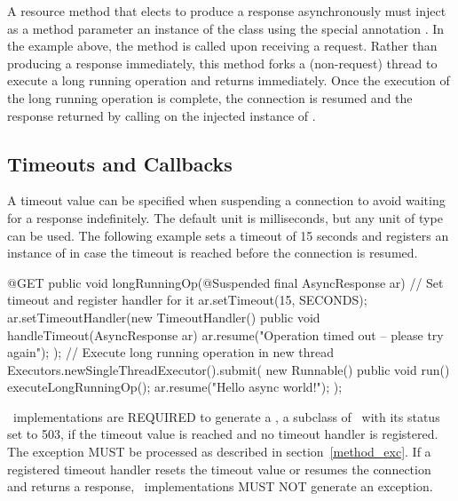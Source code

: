 A resource method that elects to produce a response asynchronously must inject as a method parameter an instance of the class  using the special annotation \Suspended. In the example above, the method  is called upon receiving a  request. Rather than producing a response immediately, this method forks a (non-request) thread to execute a long running operation and returns immediately. Once the execution of the long running operation is complete, the connection is resumed and the response returned by calling  on the injected instance of .

\subsection{Timeouts and Callbacks}
\label{suspend_annotation} %

A timeout value can be specified when suspending a connection to avoid waiting for a response indefinitely. The default unit is milliseconds, but any unit of type  can be used. The following example sets a timeout of 15 seconds and registers an instance of  in case the timeout is reached before the connection is resumed.

\begin{listing}{1}
    @GET
    public void longRunningOp(@Suspended final AsyncResponse ar) {
        // Set timeout and register handler for it
        ar.setTimeout(15, SECONDS);
        ar.setTimeoutHandler(new TimeoutHandler() {
            public void handleTimeout(AsyncResponse ar) {
                ar.resume("Operation timed out -- please try again");
            }
        });
        // Execute long running operation in new thread
        Executors.newSingleThreadExecutor().submit(
            new Runnable() {
                public void run() {
                    executeLongRunningOp();
                    ar.resume("Hello async world!");
        } });
    }
\end{listing}

\jaxrs\ implementations are REQUIRED to generate a , a subclass of \WebApplicationException\ with its status set to 503, if the timeout value is reached and no timeout handler is registered. The exception MUST be processed as described in section~\ref{method_exc}. If a registered timeout handler resets the timeout value or resumes the connection and returns a response, \jaxrs\ implementations MUST NOT generate an exception.

